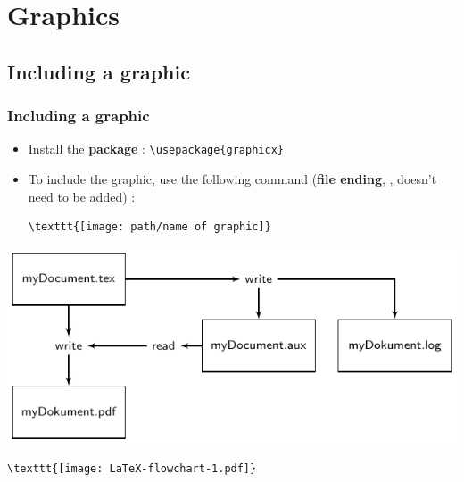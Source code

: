 \section{Graphics}


\subsection{Including a graphic}

\begin{frame}[fragile]
\frametitle{Including a graphic}


\begin{itemize}
	\item Install the \textbf{package} : \lstinline|\usepackage{graphicx}|
	
	
	\item To include the graphic, use the following command (\textbf{file ending}, \ie {}, doesn't need to be added) :
	
\begin{lstlisting}
\texttt{[image: path/name of graphic]}  
\end{lstlisting}

\end{itemize}

\pause
	


\includegraphics{../../texfiles-beamer/tex-material/WissArb-latex/LaTeX-flowchart-1.pdf}   

\begin{lstlisting}
\texttt{[image: LaTeX-flowchart-1.pdf]}    
\end{lstlisting}


\end{frame}

